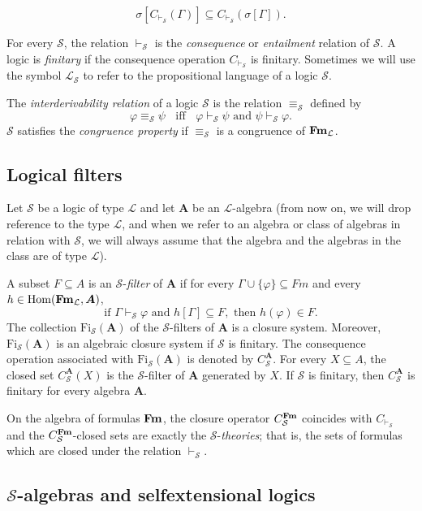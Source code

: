 \documentclass{llncs}
\numberwithin{equation}{section}
\newcommand{\LL}{\mathcal{L}}
\newcommand{\SSS}{\mathcal{S}}
\newcommand{\s}{\mathcal{S}}
\newcommand{\Ls}{\mathcal{L}_{\s}}
\newcommand{\aAA}{\boldsymbol{A}}
\newcommand{\Fi}{\mathrm{Fi}}
\begin{document}
$$\text{$\sigma[C_{\vdash_{\SSS}}(\Gamma)]\subseteq C_{\vdash_{\SSS}}(\sigma[\Gamma]).$}$$

For every $\SSS$, the relation $\vdash_{\SSS}$ is the {\em consequence} or {\em entailment} relation of $\SSS$. A logic is \textit{finitary} if the consequence operation $C_{\vdash_{\SSS}}$ is finitary. Sometimes we will use the symbol $\Ls$ to refer to the propositional language of a logic $\SSS$.

The  \textit{interderivability relation} of a logic $\SSS$  is the relation $\equiv_{\SSS}$ defined by $$\varphi  \equiv_{\SSS} \psi \;\; \text{ iff } \;\; \varphi \vdash_{\SSS} \psi \text{ and } \psi \vdash_{\SSS} \varphi.$$ $\SSS$ satisfies the \textit{congruence property} if $\equiv_{\SSS}$ is a congruence of $\Fm_{\LL}$.

\subsection{Logical filters}
Let $\SSS$ be a logic of type $\LL$ and let $\aAA$ be an $\LL$-algebra (from now on, we will drop reference to the type $\LL$, and when we refer to an algebra or class of algebras in relation with $\SSS$, we will always assume that the algebra and the algebras in the class are of type $\LL$).

A subset $F \subseteq A$ is  an $\SSS$-\textit{filter} of $\aAA$ if for every $\Gamma\cup\{\varphi\}\subseteq Fm$ and every $h\in\mathrm{Hom}(\Fm_{\LL}, \aAA)$, $$\text{if } \Gamma \vdash_{\SSS}\varphi \text{ and } h[\Gamma] \subseteq F, \text{ then } h(\varphi) \in F.$$ The collection $\Fi_{\SSS}(\aAA)$ of the $\SSS$-filters of $\aAA$ is a closure system. Moreover, $\Fi_{\SSS}(\aAA)$ is an algebraic closure system if
$\SSS$ is finitary. The consequence operation associated with $\Fi_{\SSS}(\aAA)$ is denoted by $C_{\SSS}^{\aAA}$. For every $X \subseteq A$, the closed set
$C_{\SSS}^{\aAA}(X)$ is the $\SSS$-filter of $\aAA$ generated by $X$. If $\SSS$ is finitary, then $C_{\SSS}^{\aAA}$ is finitary for every algebra $\aAA$.

On the algebra of formulas  $\mathbf{Fm}$, the closure operator $C_{\SSS}^{\Fm}$ coincides with $C_{\vdash_{\SSS}}$ and the $C_{\SSS}^{\Fm}$-closed sets are exactly the $\SSS$-\textit{theories}; that is, the sets of formulas which are closed under the relation $\vdash_{\SSS}$.

\subsection{$\SSS$-algebras and selfextensional logics}\label{subsec:Salgebras}
\end{document}
